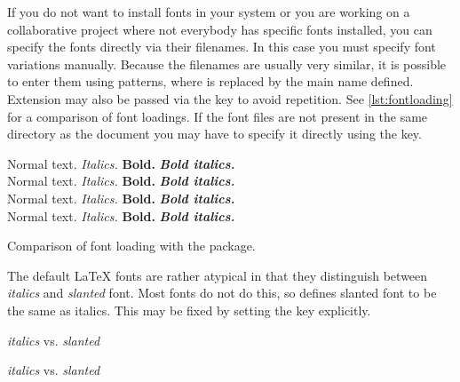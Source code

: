 If you do not want to install fonts in your system or you are working on a
collaborative project where not everybody has specific fonts installed, you can
specify the fonts directly via their filenames. In this case you must specify
font variations manually. Because the filenames are usually very similar, it is
possible to enter them using \cargv{*} patterns, where \cargv{*} is replaced by
the main name defined. Extension may also be passed via the 
key to avoid repetition. See \autoref{lst:fontloading} for a comparison of font
loadings. If the font files are not present in the same directory as the
document you may have to specify it directly using the  key.
\begin{listing}
  \begin{example}[vertical_mode, examplewidth=0.8\linewidth]
\setmainfont{Source Serif Pro}
Normal text. \textit{Italics.} \textbf{Bold.}
\textit{\textbf{Bold italics.}} \\

\setmainfont{SourceSerifPro-Regular.otf}
Normal text. \textit{Italics.} \textbf{Bold.}
\textit{\textbf{Bold italics.}} \\
 
\setmainfont[
  ItalicFont=SourceSerifPro-RegularIt.otf,
  BoldFont=SourceSerifPro-Bold.otf,
  BoldItalicFont=SourceSerifPro-BoldIt.otf,
]{SourceSerifPro-Regular.otf}
Normal text. \textit{Italics.} \textbf{Bold.}
\textit{\textbf{Bold italics.}} \\

\setmainfont[
  Extension=.otf,
  UprightFont=*-Regular,
  ItalicFont=*-RegularIt,
  BoldFont=*-Bold,
  BoldItalicFont=*-BoldIt,
]{SourceSerifPro}
Normal text. \textit{Italics.} \textbf{Bold.}
\textit{\textbf{Bold italics.}}
\end{example}
  \caption{Comparison of font loading with the 
    package.}\label{lst:fontloading}
\end{listing}

The default \LaTeX{} fonts are rather atypical in that they distinguish between
\textit{italics} and \textsl{slanted} font. Most fonts do not do this, so
 defines slanted font to be the same as italics. This may be
fixed by setting the  key explicitly.
\begin{example}[vertical_mode, examplewidth=0.7\linewidth]
\setmainfont{Latin Modern Roman}
\textit{italics} vs. \textsl{slanted}

\setmainfont[
  SlantedFont=Latin Modern Roman Slanted,
]{Latin Modern Roman}
\textit{italics} vs. \textsl{slanted}
\end{example}

